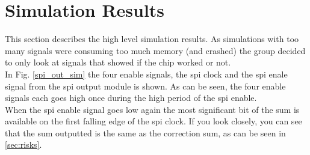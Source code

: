 \section{Simulation Results} \label{sec:simulation_results}
This section describes the high level simulation results. As simulations with too many signals were consuming too much memory (and crashed) the group decided to only look at signals that showed if the chip worked or not.\\






In Fig. \ref{spi_out_sim} the four enable signals, the spi clock and the spi enale signal from the spi output module is shown. As can be seen, the four enable signals each goes high once during the high period of the spi enable.\\
When the spi enable signal goes low again the most significant bit of the sum is available on the first falling edge of the spi clock. If you look closely, you can see that the sum outputted is the same as the correction sum, as can be seen in \ref{sec:risks}.

